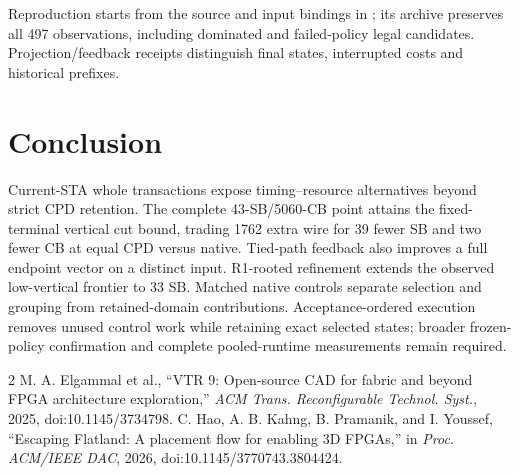 \documentclass[conference,10pt]{IEEEtran}
\begin{document}
Reproduction starts from the source and input bindings in ; its archive preserves all 497 observations, including dominated and failed-policy legal candidates. Projection/feedback receipts distinguish final states, interrupted costs and historical prefixes.

\section{Conclusion}
Current-STA whole transactions expose timing--resource alternatives beyond strict CPD retention. The complete 43-SB/5060-CB point attains the fixed-terminal vertical cut bound, trading 1762 extra wire for 39 fewer SB and two fewer CB at equal CPD versus native. Tied-path feedback also improves a full endpoint vector on a distinct input. R1-rooted refinement extends the observed low-vertical frontier to 33 SB. Matched native controls separate selection and grouping from retained-domain contributions. Acceptance-ordered execution removes unused control work while retaining exact selected states; broader frozen-policy confirmation and complete pooled-runtime measurements remain required.

\begin{thebibliography}{2}
 M. A. Elgammal et al., ``VTR 9: Open-source CAD for fabric and beyond FPGA architecture exploration,'' \emph{ACM Trans. Reconfigurable Technol. Syst.}, 2025, doi:10.1145/3734798.
 C. Hao, A. B. Kahng, B. Pramanik, and I. Youssef, ``Escaping Flatland: A placement flow for enabling 3D FPGAs,'' in \emph{Proc. ACM/IEEE DAC}, 2026, doi:10.1145/3770743.3804424.
\end{thebibliography}
\end{document}
